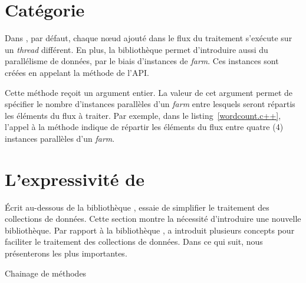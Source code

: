 \section{Cat\'egorie }

\label{execution.sect}


Dans , par d\'efaut, chaque nœud ajout\'e dans le flux du traitement s'ex\'ecute sur un \emph{thread} diff\'erent. En plus, la biblioth\`eque  permet d'introduire aussi du parall\'elisme de données, par le biais d'instances de \emph{farm}. Ces instances sont cr\'e\'ees en appelant la m\'ethode  de l’API.  

Cette méthode reçoit un argument entier.
%
La valeur de cet argument permet de sp\'ecifier le nombre d'instances parall\`eles d'un \emph{farm} entre lesquels seront r\'epartis les \'el\'ements du flux \`a traiter. Par exemple, dans le listing~\ref{wordcount.c++}, l'appel \`a la m\'ethode  indique de r\'epartir les \'el\'ements du flux entre quatre (4) instances parall\`eles d'un \emph{farm}.


\section{L'expressivit\'e de }

\label{PpFfExpressivities.sect}

\'Ecrit au-dessous de la biblioth\`eque ,  essaie de simplifier le traitement des collections de donn\'ees. Cette section montre la n\'ecessit\'e d'introduire une nouvelle biblioth\`eque. Par rapport \`a la biblioth\`eque ,  a introduit plusieurs concepts pour faciliter le traitement des collections de donn\'ees. Dans ce qui suit, nous pr\'esenterons les plus importantes.


Chainage de m\'ethodes

